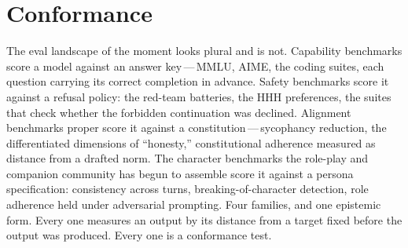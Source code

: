 %

\section{Conformance}

The eval landscape of the moment looks plural and is not. Capability benchmarks score a model against an answer key\,---\,MMLU, AIME, the coding suites, each question carrying its correct completion in advance. Safety benchmarks score it against a refusal policy: the red-team batteries, the HHH preferences, the suites that check whether the forbidden continuation was declined. Alignment benchmarks proper score it against a constitution\,---\,sycophancy reduction, the differentiated dimensions of ``honesty,'' constitutional adherence measured as distance from a drafted norm. The character benchmarks the role-play and companion community has begun to assemble score it against a persona specification: consistency across turns, breaking-of-character detection, role adherence held under adversarial prompting. Four families, and one epistemic form. Every one measures an output by its distance from a target fixed before the output was produced. Every one is a conformance test.

